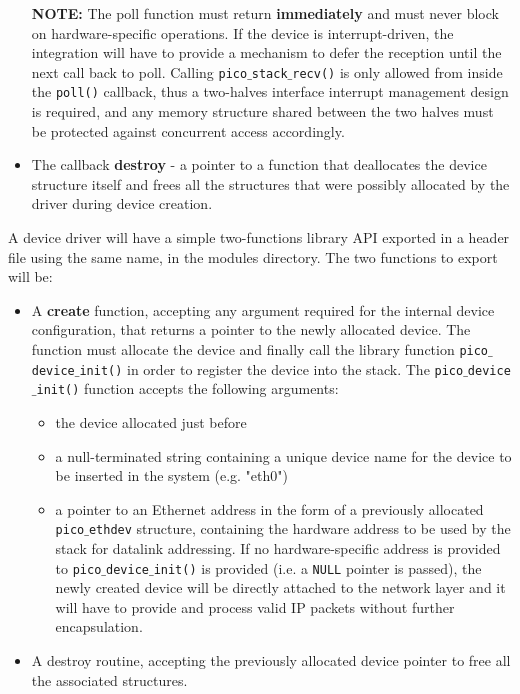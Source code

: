 \begin{itemize}
\textbf{NOTE:} The poll function must return \textbf{immediately} and must never block on
hardware-specific operations. If the device is interrupt-driven, the integration will have
to provide a mechanism to defer the reception until the next call back to poll. Calling
\texttt{pico$\_$stack$\_$recv()} is only allowed from inside the \texttt{poll()} callback,
thus a two-halves interface interrupt management design is required, and any memory structure
shared between the two halves must be protected against concurrent access accordingly.

\item The callback \textbf{destroy} - a pointer to a function that deallocates the device
structure itself and frees all the structures that were possibly allocated by the driver 
during device creation.
\end{itemize}

A device driver will have a simple two-functions library API exported in a header file using
the same name, in the modules directory. The two functions to export will be:

\begin{itemize}
\item A \textbf{create} function, accepting any argument required for the internal device configuration,
that returns a pointer to the newly allocated device. The function must allocate the device and
finally call the library function \texttt{pico$\_$device$\_$init()} in order to register the
device into the stack.
The \texttt{pico$\_$device$\_$init()} function accepts the following arguments:

\begin{itemize}
\item the device allocated just before
\item a null-terminated string containing a unique device name for the device to be inserted in
the system (e.g. "eth0")
\item a pointer to an Ethernet address in the form of a previously allocated \texttt{pico$\_$ethdev}
structure, containing the hardware address to be used by the stack for datalink addressing.
If no hardware-specific address is provided to \texttt{pico$\_$device$\_$init()} is provided
(i.e. a \texttt{NULL} pointer is passed), the newly created device will be directly attached
to the network layer and it will have to provide and process valid IP packets without further
encapsulation.
\end{itemize}

\item A destroy routine, accepting the previously allocated device pointer to free all the associated structures.

\end{itemize}

